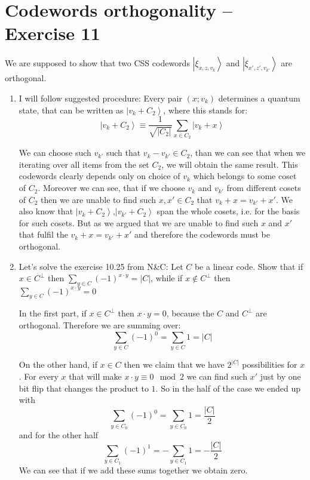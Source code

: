 \documentclass[a4paper,10pt]{article}
\newcommand{\ket}[1]{\ensuremath{\left|#1\right\rangle}} %
\begin{document}
\section*{Codewords orthogonality -- Exercise 11}
We are supposed to show that two CSS codewords \ket{\xi_{x,z,v_k}} and \ket{\xi_{x',z',v_{k'}}} are orthogonal.
\begin{enumerate}[1.]
\item I will follow suggested procedure:
Every pair $(x;v_k)$ determines a quantum state, that can be written as \ket{v_k + C_2}, where this stands for:
$$
\ket{v_k + C_2} \equiv \frac{1}{\sqrt{|C_2|}} \sum_{x \in C_2} \ket{v_k + x}
$$

We can choose such $v_{k'}$ such that $v_k-v_{k'} \in C_2$, than we can see that when we iterating over all items from the set $C_2$, we will obtain the same result. This codewords clearly depends only on choice of $v_k$ which belongs to some coset of $C_2$. Moreover we can see, that if we choose $v_k$ and $v_{k'}$ from different cosets of $C_2$ then we are unable to find such $x,x' \in C_2$ that $v_k + x = v_{k'} + x'$. We also know that \ket{v_k + C_2},\ket{v_{k'} + C_2} span the whole cosets, i.e. for the basis for such cosets. But as we argued that we are unable to find such $x$ and $x'$ that fulfil the $v_k + x = v_{k'} + x'$ and therefore the codewords must be orthogonal.

\item Let's solve the exercise 10.25 from N\&C: Let $C$ be a linear code. Show that if $x \in C^{\bot}$ then $\sum_{y \in C}(-1)^{x\cdot y} = |C|$, while if $x \notin C^{\bot}$ then $\sum_{y \in C}(-1)^{x\cdot y} = 0$

In the first part, if $x \in C^\bot$ then $x\cdot y = 0$, because the $C$ and $C^\bot$ are orthogonal. Therefore we are summing over:
$$\sum_{y \in C}(-1)^0 = \sum_{y \in C}1 = |C|$$

On the other hand, if $x \in C$ then we claim that we have $2^{|C|}$ possibilities for $x$. For every $x$ that will make $x\cdot y \equiv 0 \mod 2$ we can find such $x'$ just by one bit flip that changes the product to $1$. So in the half of the case we ended up with
$$
\sum_{y \in C_0}(-1)^0 = \sum_{y \in C_0}1 = \frac{|C|}{2}
$$
and for the other half
$$
\sum_{y \in C_1}(-1)^1 = -\sum_{y \in C_1}1 = -\frac{|C|}{2}
$$
We can see that if we add these sums together we obtain zero.


\end{enumerate}
\end{document}

